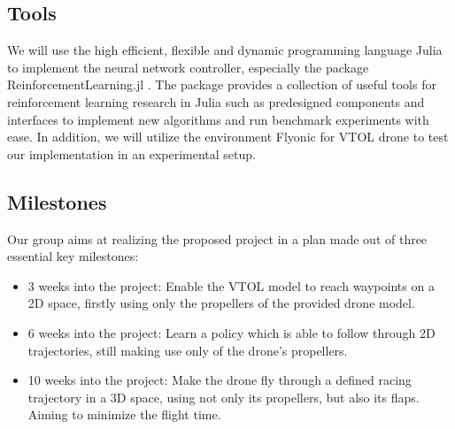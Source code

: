 \documentclass[conference]{IEEEtran}
\begin{document}
\subsection{Tools}
We will use the high efficient, flexible and dynamic programming language Julia \cite{anarticle} to implement the neural network controller, especially the package ReinforcementLearning.jl \cite{anarticle}. The package provides a collection of useful tools for reinforcement learning research in Julia such as predesigned components and interfaces to implement new algorithms and run benchmark experiments with ease.
In addition, we will utilize the environment Flyonic for VTOL drone to test our implementation in an experimental setup. 

\subsection{Milestones} 
Our group aims at realizing the proposed project in a plan made out of three essential key milestones:
\begin{itemize}
  \item 3 weeks into the project: Enable the VTOL model to reach waypoints on a 2D space, firstly using only the propellers of the provided drone model.
  \item 6 weeks into the project: Learn a policy which is able to follow through 2D trajectories, still making use only of the drone's propellers.
  \item 10 weeks into the project: Make the drone fly through a defined racing trajectory in a 3D space, using not only its propellers, but also its flaps. Aiming to minimize the flight time.
\end{itemize}




\end{document}
